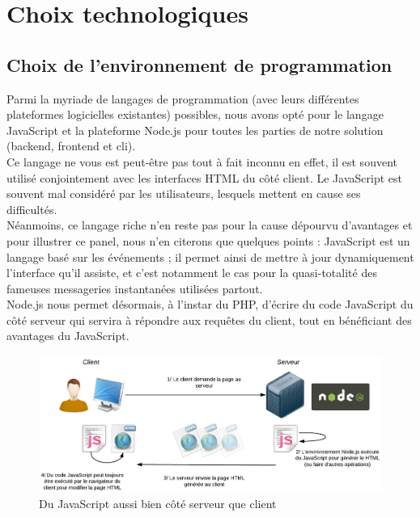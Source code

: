 \section{Choix technologiques}
\label{section:choixTechnologiques}

\subsection*{Choix de l'environnement de programmation}

Parmi la myriade de langages de programmation (avec leurs différentes plateformes logicielles existantes) possibles, nous avons opté pour le langage JavaScript et la plateforme Node.js pour toutes les parties de notre solution (\gls{backend}, \gls{frontend} et \Gls{cli}). \\

Ce langage ne vous est peut-être pas tout à fait inconnu en effet, il est souvent utilisé conjointement avec les interfaces HTML du côté client. Le JavaScript est souvent mal considéré par les utilisateurs, lesquels mettent en cause ses difficultés. \\

Néanmoins, ce langage riche n’en reste pas pour la cause dépourvu d’avantages et pour illustrer ce panel, nous n'en citerons que quelques points : JavaScript est un langage basé sur les événements ; il permet ainsi de mettre à jour dynamiquement l’interface qu’il assiste, et c’est notamment le cas pour la quasi-totalité des fameuses messageries instantanées utilisées partout.\\

Node.js nous permet désormais, à l'instar du PHP, d'écrire du code JavaScript du côté serveur qui servira à répondre aux requêtes du client, tout en bénéficiant des avantages du JavaScript. \\

\begin{figure}[H]
    \includegraphics[width=\textwidth,height=0.3\textheight,keepaspectratio]{images/choixTechnologiques/SchemaNodejs.png}
    \centering
    \caption[Du JavaScript aussi bien côté serveur que client]{Du JavaScript aussi bien côté serveur que client~\cite{NodejsIllustrations}}
    \label{pic:WhatIsNodeJs}
\end{figure}

